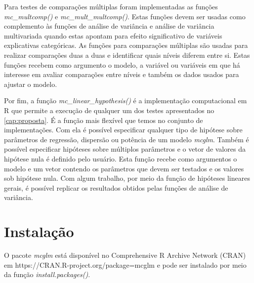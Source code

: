 Para testes de comparações múltiplas foram implementadas as funções \emph{mc\_multcomp()} e \emph{mc\_mult\_multcomp()}. Estas funções devem ser usadas como complemento às funções de análise de variância e análise de variância multivariada quando estas apontam para efeito significativo de variáveis explicativas categóricas. As funções para comparações múltiplas são usadas para realizar comparações duas a duas e identificar quais níveis diferem entre si. Estas funções recebem como argumento o modelo, a variável ou variáveis em que há interesse em avaliar comparações entre níveis e também os dados usados para ajustar o modelo.

Por fim, a função \emph{mc\_linear\_hypothesis()} é a implementação computacional em R que permite a execução de qualquer um dos testes apresentados no \autoref{cap:proposta}. É a função mais flexível que temos no conjunto de implementações. Com ela é possível especificar qualquer tipo de hipótese sobre parâmetros de regressão, dispersão ou potência de um modelo \emph{mcglm}. Também é possível especificar hipóteses sobre múltiplos parâmetros e o vetor de valores da hipótese nula é definido pelo usuário. Esta função recebe como argumentos o modelo e um vetor contendo os parâmetros que devem ser testados e os valores sob hipótese nula. Com algum trabalho, por meio da função de hipóteses lineares gerais, é possível replicar os resultados obtidos pelas funções de análise de variância.


\section{Instalação}



O pacote \emph{mcglm} está disponível no Comprehensive R Archive Network (CRAN) em https://CRAN.R-project.org/package=mcglm e pode ser instalado por meio da função \emph{install.packages()}.

\begin{knitrout}
\color{fgcolor}\begin{kframe}
\begin{alltt}
\hlstd{(}\hlstd{)}
\end{alltt}
\end{kframe}
\end{knitrout}


